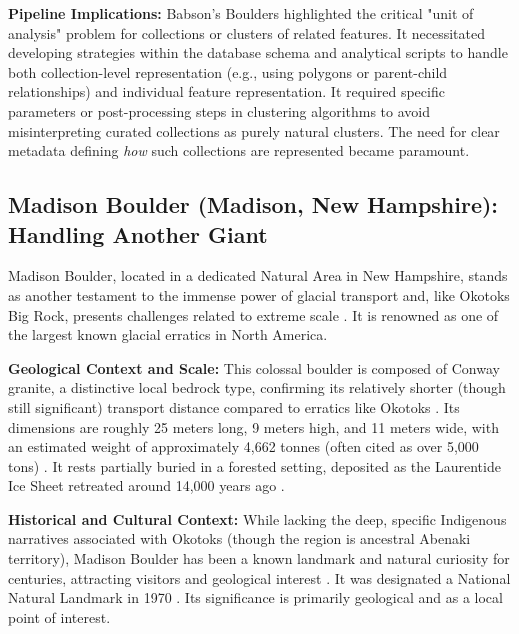 \documentclass[
11pt, %
english, %
singlespacing, %
headsepline, %
]{MastersDoctoralThesis} %
\begin{document}
\textbf{Pipeline Implications:} Babson's Boulders highlighted the critical "unit of analysis" problem for collections or clusters of related features. It necessitated developing strategies within the database schema and analytical scripts to handle both collection-level representation (e.g., using polygons or parent-child relationships) and individual feature representation. It required specific parameters or post-processing steps in clustering algorithms to avoid misinterpreting curated collections as purely natural clusters. The need for clear metadata defining \emph{how} such collections are represented became paramount.

\subsection{Madison Boulder (Madison, New Hampshire): Handling Another Giant}
\label{subsec:madison}

Madison Boulder, located in a dedicated Natural Area in New Hampshire, stands as another testament to the immense power of glacial transport and, like Okotoks Big Rock, presents challenges related to extreme scale \cite{Goldthwait1925, NHMadisonBoulder}. It is renowned as one of the largest known glacial erratics in North America.

\textbf{Geological Context and Scale:} This colossal boulder is composed of Conway granite, a distinctive local bedrock type, confirming its relatively shorter (though still significant) transport distance compared to erratics like Okotoks \cite{Goldthwait1925, NPSMadisonBoulder}. Its dimensions are roughly 25 meters long, 9 meters high, and 11 meters wide, with an estimated weight of approximately 4,662 tonnes (often cited as over 5,000 tons) \cite{NHMadisonBoulder, NPSMadisonBoulder}. It rests partially buried in a forested setting, deposited as the Laurentide Ice Sheet retreated around 14,000 years ago \cite{Goldthwait1925}.

\textbf{Historical and Cultural Context:} While lacking the deep, specific Indigenous narratives associated with Okotoks (though the region is ancestral Abenaki territory), Madison Boulder has been a known landmark and natural curiosity for centuries, attracting visitors and geological interest \cite{NHMadisonBoulder}. It was designated a National Natural Landmark in 1970 \cite{NPSMadisonBoulder}. Its significance is primarily geological and as a local point of interest.
\end{document}
